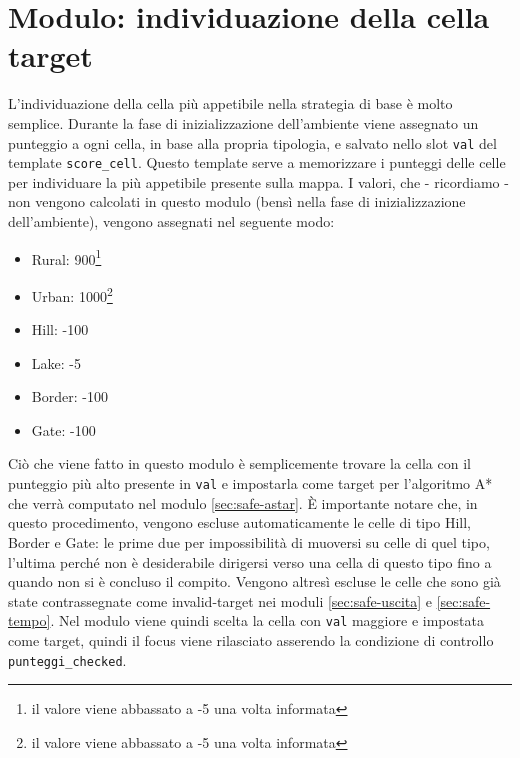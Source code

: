 \section{Modulo: individuazione della cella target} \label{sec:safe-target}
L'individuazione della cella più appetibile nella strategia di base è molto semplice. Durante la fase di inizializzazione dell'ambiente viene assegnato un punteggio a ogni cella, in base alla propria tipologia, e salvato nello slot \texttt{val} del template \texttt{score\_cell}. Questo template serve a memorizzare i punteggi delle celle per individuare la più appetibile presente sulla mappa. I valori, che - ricordiamo - non vengono calcolati in questo modulo (bensì nella fase di inizializzazione dell'ambiente), vengono assegnati nel seguente modo:
\begin{itemize}
	\item Rural: 900\footnote{il valore viene abbassato a -5 una volta informata}
	\item Urban: 1000\footnote{il valore viene abbassato a -5 una volta informata}
	\item Hill: -100
	\item Lake: -5
	\item Border: -100
	\item Gate: -100
\end{itemize}
Ciò che viene fatto in questo modulo è semplicemente trovare la cella con il punteggio più alto presente in \texttt{val} e impostarla come target per l'algoritmo A* che verrà computato nel modulo \ref{sec:safe-astar}. È importante notare che, in questo procedimento, vengono escluse automaticamente le celle di tipo Hill, Border e Gate: le prime due per impossibilità di muoversi su celle di quel tipo, l'ultima perché non è desiderabile dirigersi verso una cella di questo tipo fino a quando non si è concluso il compito.
Vengono altresì escluse le celle che sono già state contrassegnate come invalid-target nei moduli \ref{sec:safe-uscita} e \ref{sec:safe-tempo}.
Nel modulo viene quindi scelta la cella con \texttt{val} maggiore e impostata come target, quindi il focus viene rilasciato asserendo la condizione di controllo \texttt{punteggi\_checked}.

